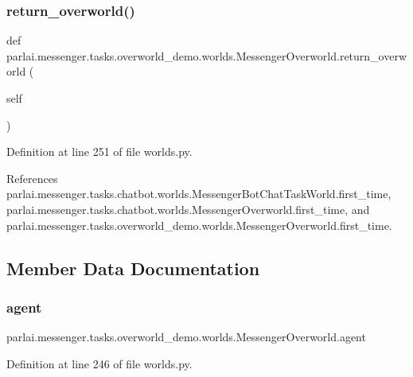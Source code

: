 \subsubsection{\texorpdfstring{return\+\_\+overworld()}{return\_overworld()}}
{\footnotesize\ttfamily def parlai.\+messenger.\+tasks.\+overworld\+\_\+demo.\+worlds.\+Messenger\+Overworld.\+return\+\_\+overworld (\begin{DoxyParamCaption}\item[{}]{self }\end{DoxyParamCaption})}



Definition at line 251 of file worlds.\+py.



References parlai.\+messenger.\+tasks.\+chatbot.\+worlds.\+Messenger\+Bot\+Chat\+Task\+World.\+first\+\_\+time, parlai.\+messenger.\+tasks.\+chatbot.\+worlds.\+Messenger\+Overworld.\+first\+\_\+time, and parlai.\+messenger.\+tasks.\+overworld\+\_\+demo.\+worlds.\+Messenger\+Overworld.\+first\+\_\+time.



\subsection{Member Data Documentation}
\mbox{\label{classparlai_1_1messenger_1_1tasks_1_1overworld__demo_1_1worlds_1_1MessengerOverworld_ad8f31cb268f8cabc723bdacd443181d7}} 
\subsubsection{\texorpdfstring{agent}{agent}}
{\footnotesize\ttfamily parlai.\+messenger.\+tasks.\+overworld\+\_\+demo.\+worlds.\+Messenger\+Overworld.\+agent}



Definition at line 246 of file worlds.\+py.



